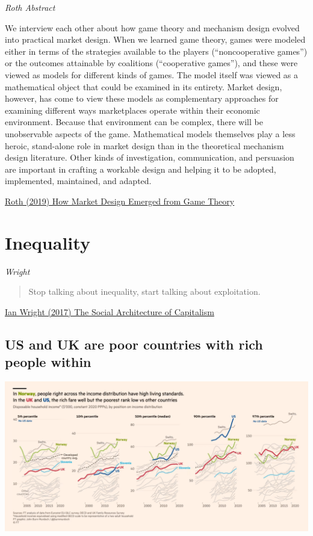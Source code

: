\documentclass[
]{book}
\begin{document}
\emph{Roth Abstract}

We interview each other about how game theory and mechanism design evolved into practical market design. When we learned game theory, games were modeled either in terms of the strategies available to the players (``noncooperative games'') or the outcomes attainable by coalitions (``cooperative games''), and these were viewed as models for different kinds of games. The model itself was viewed as a mathematical object that could be examined in its entirety. Market design, however, has come to view these models as complementary approaches for examining different ways marketplaces operate within their economic environment. Because that environment can be complex, there will be unobservable aspects of the game. Mathematical models themselves play a less heroic, stand-alone role in market design than in the theoretical mechanism design literature. Other kinds of investigation, communication, and persuasion are important in crafting a workable design and helping it to be adopted, implemented, maintained, and adapted.

\href{https://www.aeaweb.org/articles?id=10.1257/jep.33.3.118}{Roth (2019) How Market Design Emerged from Game Theory}

\hypertarget{inequality}{%
\chapter{Inequality}\label{inequality}}

\emph{Wright}

\begin{quote}
Stop talking about inequality, start talking about exploitation.
\end{quote}

\href{https://ianwrightsite.wordpress.com/2017/11/16/the-social-architecture-of-capitalism/}{Ian Wright (2017) The Social Architecture of Capitalism}

\hypertarget{us-and-uk-are-poor-countries-with-rich-people-within}{%
\section{US and UK are poor countries with rich people within}\label{us-and-uk-are-poor-countries-with-rich-people-within}}

\includegraphics{fig/US_UK_Poor_Countries_with_Rich_People.png}
\end{document}
